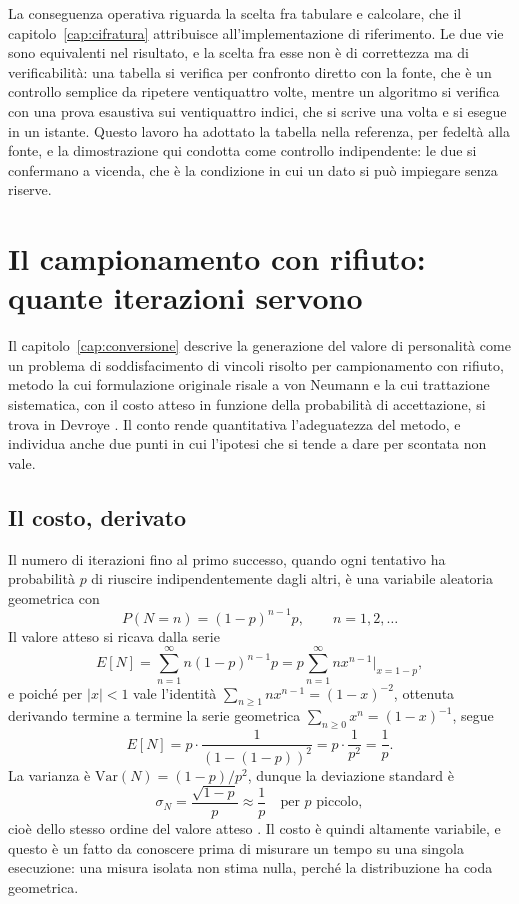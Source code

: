 La conseguenza operativa riguarda la scelta fra tabulare e calcolare, che il capitolo~\ref{cap:cifratura} attribuisce all'implementazione di riferimento. Le due vie sono equivalenti nel risultato, e la scelta fra esse non è di correttezza ma di verificabilità: una tabella si verifica per confronto diretto con la fonte, che è un controllo semplice da ripetere ventiquattro volte, mentre un algoritmo si verifica con una prova esaustiva sui ventiquattro indici, che si scrive una volta e si esegue in un istante. Questo lavoro ha adottato la tabella nella referenza, per fedeltà alla fonte, e la dimostrazione qui condotta come controllo indipendente: le due si confermano a vicenda, che è la condizione in cui un dato si può impiegare senza riserve.

\section{Il campionamento con rifiuto: quante iterazioni servono}

Il capitolo~\ref{cap:conversione} descrive la generazione del valore di personalità come un problema di soddisfacimento di vincoli risolto per campionamento con rifiuto, metodo la cui formulazione originale risale a von Neumann \cite{vonneumann51} e la cui trattazione sistematica, con il costo atteso in funzione della probabilità di accettazione, si trova in Devroye \cite{devroye}. Il conto rende quantitativa l'adeguatezza del metodo, e individua anche due punti in cui l'ipotesi che si tende a dare per scontata non vale.

\subsection{Il costo, derivato}

Il numero di iterazioni fino al primo successo, quando ogni tentativo ha probabilità $p$ di riuscire indipendentemente dagli altri, è una variabile aleatoria geometrica con
\[
P(N = n) = (1-p)^{n-1} p, \qquad n = 1, 2, \dots
\]
Il valore atteso si ricava dalla serie
\[
E[N] = \sum_{n=1}^{\infty} n (1-p)^{n-1} p = p \sum_{n=1}^{\infty} n x^{n-1} \Big|_{x = 1-p},
\]
e poiché per $|x| < 1$ vale l'identità $\sum_{n \ge 1} n x^{n-1} = (1-x)^{-2}$, ottenuta derivando termine a termine la serie geometrica $\sum_{n \ge 0} x^n = (1-x)^{-1}$, segue
\[
E[N] = p \cdot \frac{1}{(1 - (1-p))^2} = p \cdot \frac{1}{p^2} = \frac{1}{p}.
\]
La varianza è $\mathrm{Var}(N) = (1-p)/p^2$, dunque la deviazione standard è
\[
\sigma_N = \frac{\sqrt{1-p}}{p} \approx \frac{1}{p} \quad \text{per } p \text{ piccolo},
\]
cioè dello stesso ordine del valore atteso \cite{feller}. Il costo è quindi altamente variabile, e questo è un fatto da conoscere prima di misurare un tempo su una singola esecuzione: una misura isolata non stima nulla, perché la distribuzione ha coda geometrica.

